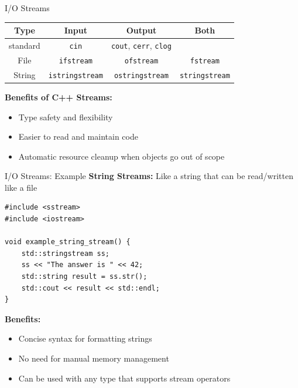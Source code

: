 \begin{frame}[fragile]{I/O Streams}
    \begin{table}[]
        \begin{tabular}{cccc}
            \hline
            \textbf{Type} & \textbf{Input} & \textbf{Output} & \textbf{Both} \\ \hline
            standard & \texttt{cin} & \texttt{cout}, \texttt{cerr}, \texttt{clog} &  \\ \hline
            File         & \texttt{ifstream} & \texttt{ofstream} & \texttt{fstream} \\ \hline
            String       & \texttt{istringstream} & \texttt{ostringstream} & \texttt{stringstream} \\ \hline
        \end{tabular}
    \end{table}

	\textbf{Benefits of C++ Streams:}
	\begin{itemize}
		\item Type safety and flexibility
		\item Easier to read and maintain code
		\item Automatic resource cleanup when objects go out of scope
	\end{itemize}
\end{frame}

\begin{frame}[fragile]{I/O Streams: Example}
    \textbf{String Streams:} Like a string that can be read/written like a file
    \begin{verbatim}
#include <sstream>
#include <iostream>

void example_string_stream() {
    std::stringstream ss;
    ss << "The answer is " << 42;
    std::string result = ss.str();
    std::cout << result << std::endl;
}
    \end{verbatim}

    \textbf{Benefits:}
    \begin{itemize}
        \item Concise syntax for formatting strings
        \item No need for manual memory management
        \item Can be used with any type that supports stream operators
    \end{itemize}
\end{frame}

